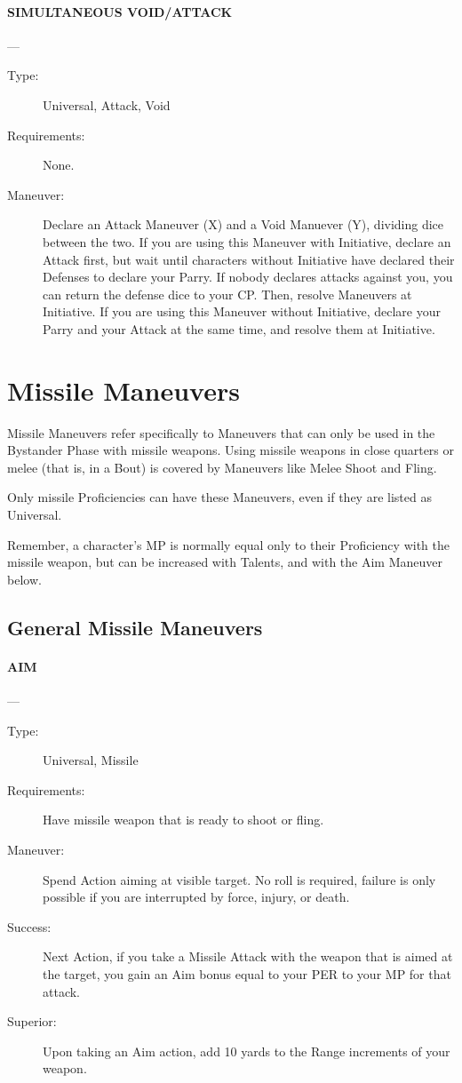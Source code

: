 \documentclass[oneside,11pt,english]{book}
\begin{document}
\paragraph{\large\label{man:SIMULTANEOUS VOID/ATTACK} SIMULTANEOUS VOID/ATTACK}---\quad{\large[X+Y+2]}
\vspace{-10pt}\begin{description} 
\item [Type:] Universal, Attack, Void 
\item [Requirements:] None. 
\item [Maneuver:] Declare an Attack Maneuver (X) and a Void Manuever (Y), dividing dice between the two. 
If you are using this Maneuver with Initiative, declare an Attack first, but wait until characters without 
Initiative have declared their Defenses to declare your Parry. If nobody declares attacks against you, you 
can return the defense dice to your CP. Then, resolve Maneuvers at Initiative. 
If you are using this Maneuver without Initiative, declare your Parry and your Attack at the same time, 
and resolve them at Initiative. 
\end{description}
\section{Missile Maneuvers}
Missile Maneuvers refer specifically to Maneuvers that can only be used in the Bystander Phase with 
missile weapons. Using missile weapons in close quarters or melee (that is, in a Bout) is covered by 
Maneuvers like Melee Shoot and Fling. 

Only missile Proficiencies can have these Maneuvers, even if they are listed as Universal. 

Remember, a character’s MP is normally equal only to their Proficiency with the missile weapon, but can 
be increased with Talents, and with the Aim Maneuver below. 
\subsection{General Missile Maneuvers}
\paragraph{\large\label{man:AIM} AIM}---\quad{\large[0]}
\vspace{-10pt}\begin{description} 
\item [Type:] Universal, Missile 
\item [Requirements:] Have missile weapon that is ready to shoot or fling. 
\item [Maneuver:] Spend Action aiming at visible target. No roll is required, failure is only possible if you are 
interrupted by force, injury, or death. 
\item [Success:] Next Action, if you take a Missile Attack with the weapon that is aimed at the target, you gain 
an Aim bonus equal to your PER to your MP for that attack. 
\item [Superior:] Upon taking an Aim action, add 10 yards to the Range increments of your weapon. 
\end{description}
\end{document}
